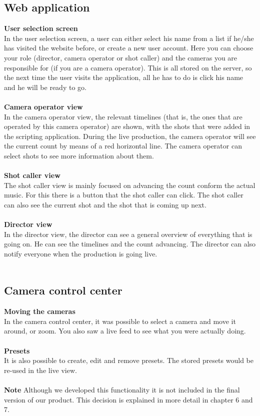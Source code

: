 \subsection{Web application}
\textbf{User selection screen}\\
In the user selection screen, a user can either select his name from a list if he/she has visited the website before, or create a new user account. Here you can choose your role (director, camera operator or shot caller) and the cameras you are responsible for (if you are a camera operator). This is all stored on the server, so the next time the user visits the application, all he has to do is click his name and he will be ready to go.\\\\
\textbf{Camera operator view}\\
In the camera operator view, the relevant timelines (that is, the ones that are operated by this camera operator) are shown, with the shots that were added in the scripting application. During the live production, the camera operator will see the current count by means of a red horizontal line. The camera operator can select shots to see more information about them.\\\\
\textbf{Shot caller view}\\
The shot caller view is mainly focused on advancing the count conform the actual music. For this there is a button that the shot caller can click. The shot caller can also see the current shot and the shot that is coming up next.\\\\
\textbf{Director view}\\
In the director view, the director can see a general overview of everything that is going on. He can see the timelines and the count advancing. The director can also notify everyone when the production is going live.\\\\

\subsection{Camera control center}
\textbf{Moving the cameras}\\
In the camera control center, it was possible to select a camera and move it around, or zoom. You also saw a live feed to see what you were actually doing.\\\\
\textbf{Presets}\\
It is also possible to create, edit and remove presets. The stored presets would be re-used in the live view.\\\\
\textbf{Note}
Although we developed this functionality it is not included in the final version of our product. This decision is explained in more detail in chapter 6 and 7.\\\\

